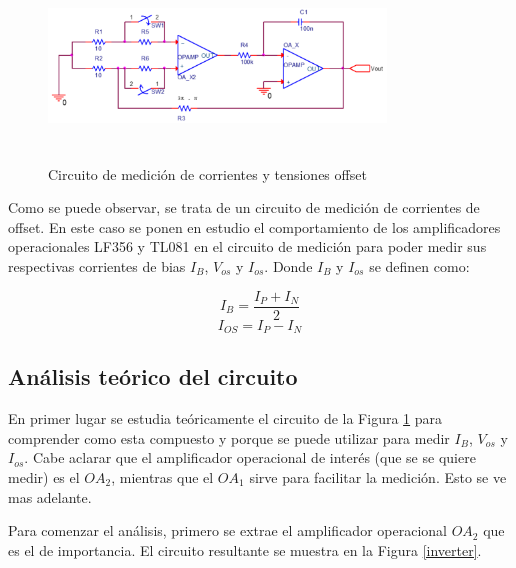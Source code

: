 \begin{figure}[ht]                                                       
    \centering\includegraphics[width=0.8\textwidth, height=5cm]{../Ex3/Figuras/circuito_medicion.png}
     \caption{Circuito de medición de corrientes y tensiones offset}
     \label{circuito_medicion}
     \end{figure}

     
Como se puede observar, se trata de un circuito de medición de corrientes de offset. En este caso se ponen en estudio el comportamiento de los
amplificadores operacionales LF356 y TL081 en el circuito de medición para poder medir sus respectivas corrientes de bias $I_B$, $V_{os}$ y $I_{os}$. Donde $I_B$ y $I_{os}$ se definen como:

\begin{equation} I_{B} = \frac{I_P+I_N}{2} \label{corriente_bias}\end{equation}
\begin{equation} I_{OS} = I_P - I_N \label{corriente_offset}\end{equation}

\subsection{Análisis teórico del circuito}


En primer lugar se estudia teóricamente el circuito de la Figura \ref{circuito_medicion} para comprender como esta compuesto y porque se puede utilizar para medir $I_B$, 
$V_{os}$  y $I_{os}$. Cabe aclarar que el amplificador operacional de interés (que se se quiere medir) es el $OA_2$, mientras que el $OA_1$ sirve para facilitar la medición. Esto se ve mas adelante.   

Para comenzar el análisis, primero se extrae el amplificador operacional $OA_2$ que es el de importancia. El circuito resultante se muestra en la Figura \ref{inverter}.

